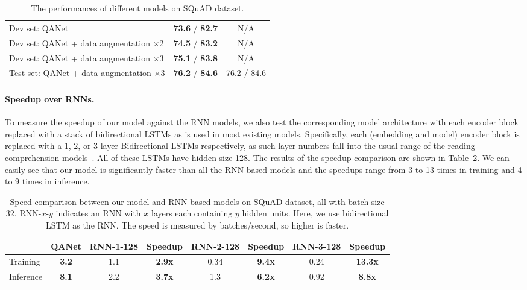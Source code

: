\documentclass{article} \usepackage{iclr2018_conference,times}
\begin{document}
\begin{table}[ht]
\begin{center}
\begin{tabular}{lcc}
\hline
Dev set: QANet &  \textbf{73.6} / \textbf{82.7} & N/A\\
Dev set: QANet + data augmentation $\times$2 & \textbf{74.5} / \textbf{83.2} & N/A\\
Dev set: QANet + data augmentation $\times$3 &  \textbf{75.1} / \textbf{83.8}& N/A\\\hline
Test set: QANet + data augmentation $\times$3 &  \textbf{76.2} / \textbf{84.6 }& 76.2 / 84.6\\
\hline \end{tabular}
\end{center}
\caption{The performances of different models on SQuAD dataset. 
}
\label{table:squad_all}
\end{table}


\paragraph{Speedup over RNNs.}
To measure the speedup of our model against the RNN models, we also test the corresponding model architecture with each encoder block replaced with a stack of bidirectional LSTMs as is used in most existing models.  Specifically, each (embedding and model) encoder block is replaced with a 1, 2, or 3 layer Bidirectional LSTMs respectively, as such layer numbers fall into the usual range of the reading comprehension models~\citep{ChenFWB17}. All of these LSTMs have hidden size 128. The results of the speedup comparison are shown in Table~\ref{table:squad_speedup}. We can easily see that our model is significantly faster than all the RNN based models and the speedups range from 3 to 13 times in training and 4 to 9 times in inference. 




\begin{table}[h!]
\small
\begin{center}
\begin{tabular}{l|c|cc|cc|cc}
\hline &QANet & RNN-1-128 & Speedup & RNN-2-128 & Speedup & RNN-3-128 & Speedup \\\hline
Training& \textbf{3.2} & 1.1 & \textbf{2.9x}  & 0.34 & \textbf{9.4x} & 0.24& \textbf{13.3x}\\
Inference& \textbf{8.1} & 2.2 & \textbf{3.7x}  & 1.3 & \textbf{6.2x} & 0.92 & \textbf{8.8x} 
\\\hline \end{tabular}
\end{center}
\caption{Speed comparison between our model and RNN-based models on SQuAD dataset, all with batch size 32. RNN-$x$-$y$ indicates an RNN with $x$ layers each containing $y$ hidden units. Here, we use bidirectional LSTM as the RNN. The speed is measured by batches/second, so higher is faster.}
\label{table:squad_speedup}
\end{table}
\end{document}
